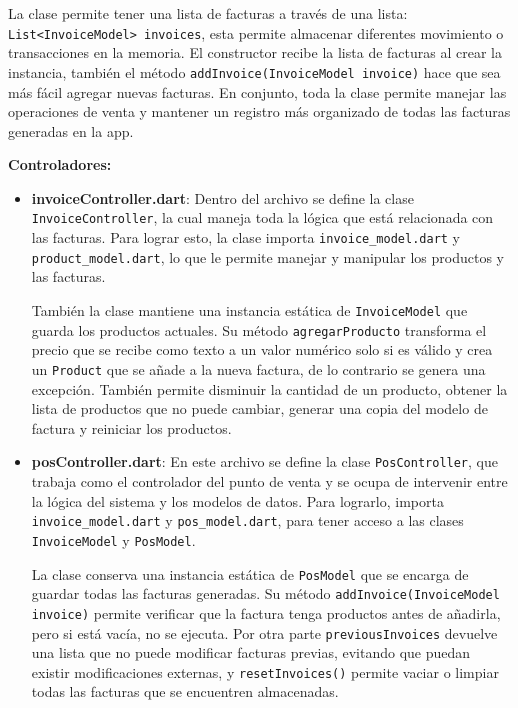 \begin{itemize}
    La clase permite tener una lista de facturas a través de una lista: \texttt{List<InvoiceModel> invoices}, esta permite almacenar diferentes movimiento o transacciones en la memoria. El constructor recibe la lista de facturas al crear la instancia, también el método \texttt{addInvoice(InvoiceModel invoice)} hace que sea más fácil agregar nuevas facturas. En conjunto, toda la clase permite manejar las operaciones de venta y mantener un registro más organizado de todas las facturas generadas en la app.
\end{itemize}

\textbf{Controladores:}  
\begin{itemize}
    \item \textbf{invoiceController.dart}: Dentro del archivo se define la clase \texttt{InvoiceController}, la cual maneja toda la lógica que está relacionada con las facturas. Para lograr esto, la clase importa \texttt{invoice\_model.dart} y \texttt{product\_model.dart}, lo que le permite manejar y manipular los productos y las facturas.

    También la clase mantiene una instancia estática de \texttt{InvoiceModel} que guarda los productos actuales. Su método \texttt{agregarProducto} transforma el precio que se recibe como texto a un valor numérico solo si es válido y crea un \texttt{Product} que se añade a la nueva factura, de lo contrario se genera una excepción. También permite disminuir la cantidad de un producto, obtener la lista de productos que no puede cambiar, generar una copia del modelo de factura y reiniciar los productos.
    
    
    \item \textbf{posController.dart}: En este archivo se define la clase \texttt{PosController}, que trabaja como el controlador del punto de venta y se ocupa de intervenir entre la lógica del sistema y los modelos de datos. Para lograrlo, importa \texttt{invoice\_model.dart} y \texttt{pos\_model.dart}, para tener acceso a las clases \texttt{InvoiceModel} y \texttt{PosModel}.

    La clase conserva una instancia estática de \texttt{PosModel} que se encarga de guardar todas las facturas generadas. Su método \texttt{addInvoice(InvoiceModel invoice)} permite verificar que la factura tenga productos antes de añadirla, pero si está vacía, no se ejecuta. Por otra parte \texttt{previousInvoices} devuelve una lista que no puede modificar facturas previas, evitando que puedan existir modificaciones externas, y \texttt{resetInvoices()} permite vaciar o limpiar todas las facturas que se encuentren almacenadas.
\end{itemize}



